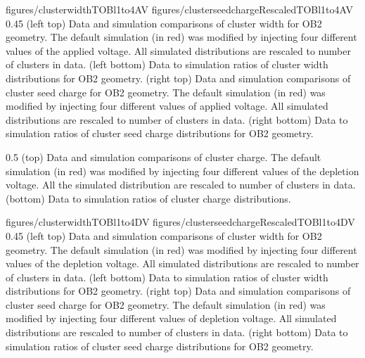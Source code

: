                  {figures/clusterwidthTOBl1to4AV}
                 {figures/clusterseedchargeRescaledTOBl1to4AV} %
                 {0.45}       %
                 {(left top) Data and simulation  comparisons of cluster width for OB2 geometry. The default simulation (in red) was modified by injecting four different values of the applied voltage. All simulated distributions are rescaled to number of clusters in data. (left bottom) Data to simulation ratios of cluster width distributions for OB2 geometry. (right top) Data and simulation  comparisons of cluster seed charge for OB2 geometry. The default simulation (in red) was modified by injecting four different values of applied voltage. All simulated distributions are rescaled to number of clusters in data. (right bottom) Data to simulation ratios of cluster seed charge distributions for OB2 geometry. }


                 {0.5}       %
                 { (top) Data and simulation comparisons of cluster charge. The default simulation (in red) was modified by injecting four different values of the depletion voltage. All the simulated distribution are rescaled to number of clusters in data. (bottom) Data to simulation ratios of cluster charge distributions. }

                 {figures/clusterwidthTOBl1to4DV}
                 {figures/clusterseedchargeRescaledTOBl1to4DV} %
                 {0.45}       %
                 {(left top) Data and simulation  comparisons of cluster width for OB2 geometry. The default simulation (in red) was modified by injecting four different values of the depletion voltage. All simulated distributions are rescaled to number of clusters in data. (left bottom) Data to simulation ratios of cluster width distributions for OB2 geometry. (right top) Data and simulation  comparisons of cluster seed charge for OB2 geometry. The default simulation (in red) was modified by injecting four different values of depletion voltage. All simulated distributions are rescaled to number of clusters in data. (right bottom) Data to simulation ratios of cluster seed charge distributions for OB2 geometry. }

